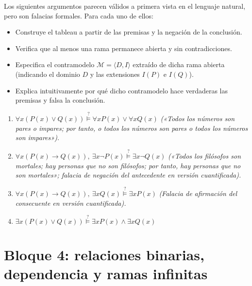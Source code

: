\begin{pregunta}\label{e6-6}
Los siguientes argumentos parecen válidos a primera vista en el lenguaje natural, pero son falacias formales. Para cada uno de ellos:
\begin{itemize}
    \item Construye el tableau a partir de las premisas y la negación de la conclusión.
    \item Verifica que al menos una rama permanece abierta y sin contradicciones.
    \item Especifica el contramodelo $\mathcal{M} = \langle D, I \rangle$ extraído de dicha rama abierta (indicando el dominio $D$ y las extensiones $I(P)$ e $I(Q)$).
    \item Explica intuitivamente por qué dicho contramodelo hace verdaderas las premisas y falsa la conclusión.
\end{itemize}

\begin{enumerate}
    \item $\forall x (P(x) \lor Q(x)) \stackrel{?}{\models} \forall x P(x) \lor \forall x Q(x)$  
    \emph{(«Todos los números son pares o impares; por tanto, o todos los números son pares o todos los números son impares»).}
    
    \item $\forall x (P(x) \to Q(x)), \ \exists x \neg P(x) \stackrel{?}{\models} \exists x \neg Q(x)$  
    \emph{(«Todos los filósofos son mortales; hay personas que no son filósofos; por tanto, hay personas que no son mortales»; falacia de negación del antecedente en versión cuantificada).}
    
    \item $\forall x (P(x) \to Q(x)), \ \exists x Q(x) \stackrel{?}{\models} \exists x P(x)$  
    \emph{(Falacia de afirmación del consecuente en versión cuantificada).}
    
    \item $\exists x (P(x) \lor Q(x)) \stackrel{?}{\models} \exists x P(x) \land \exists x Q(x)$
\end{enumerate}
\end{pregunta}

\section*{Bloque 4: relaciones binarias, dependencia y ramas infinitas}

